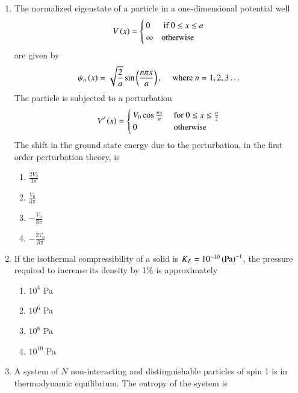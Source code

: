 \documentclass[journal]{IEEEtran}
\begin{document}
\begin{enumerate}
\begin{multicols}{4}
\begin{enumerate}
    \end{enumerate}
\end{multicols}
\item The normalized eigenstate of a particle in a one-dimensional potential well
\begin{align*}
    V\left(x\right)=
    \begin{cases}
    0 & \text{ if } 0 \le x \le a \\ \infty & \text{otherwise}
    \end{cases}
\end{align*}
are given by
\begin{align*}
    \psi_n\left(x\right)=\sqrt{\frac{2}{a}}\sin\left(\frac{n\pi x}{a}\right) , \quad \text{ where } n=1,2,3\dots
\end{align*}
The particle is subjected to a perturbation
\begin{align*}
V^\prime \left(x\right)=
    \begin{cases}
    V_0\cos{\frac{\pi x}{a}} & \text{  for }0 \le x \le \frac{a}{2}
    \\ 0 & \text{\space otherwise}
    \end{cases}
\end{align*}
The shift in the ground state energy due to the perturbation, in the first order perturbation theory, is
\begin{multicols}{4}
    \begin{enumerate}
        \item $\frac{2V_0}{3\pi}$
        \item $\frac{V_0}{3\pi}$
        \item $-\frac{V_0}{3\pi}$
        \item $-\frac{2V_0}{3\pi}$
    \end{enumerate}
\end{multicols}
\item If the isothermal compressibility of a solid is $K_T = 10^{-10} \left(\text{Pa}\right)^{-1}$, the pressure required to increase its density by 1\% is approximately
\begin{multicols}{4}
    \begin{enumerate}
        \item $10^4$ Pa
        \item $10^6$ Pa
        \item $10^8$ Pa
        \item $10^{10}$ Pa
    \end{enumerate}
\end{multicols}
\item A system of $N$ non-interacting and distinguishable particles of spin 1 is in thermodynamic equilibrium. The entropy of the system is

\end{enumerate}
\end{document}
